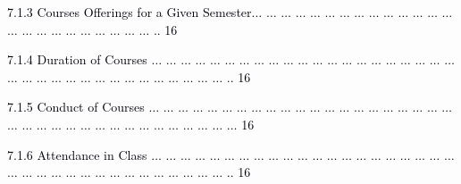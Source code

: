 \documentclass[12pt]{article}
\begin{document}
\vspace{\baselineskip}
\begin{adjustwidth}{0.5in}{0.0in}
{\fontsize{7pt}{8.4pt}\selectfont \textcolor[HTML]{00000A}{7.1.3 Courses Offerings for a Given Semester$ \ldots $ $ \ldots $ $ \ldots $ $ \ldots $ $ \ldots $ $ \ldots $ $ \ldots $ $ \ldots $ $ \ldots $ $ \ldots $ $ \ldots $ $ \ldots $ $ \ldots $ $ \ldots $ $ \ldots $ $ \ldots $ $ \ldots $ $ \ldots $ $ \ldots $ $ \ldots $ $ \ldots $ $ \ldots $ $ \ldots $ $ \ldots $ .. 16}\par}\par

\end{adjustwidth}


\vspace{\baselineskip}
\begin{adjustwidth}{0.5in}{0.0in}
{\fontsize{7pt}{8.4pt}\selectfont \textcolor[HTML]{00000A}{7.1.4 Duration of Courses $ \ldots $ $ \ldots $ $ \ldots $ $ \ldots $ $ \ldots $ $ \ldots $ $ \ldots $ $ \ldots $ $ \ldots $ $ \ldots $ $ \ldots $ $ \ldots $ $ \ldots $ $ \ldots $ $ \ldots $ $ \ldots $ $ \ldots $ $ \ldots $ $ \ldots $ $ \ldots $ $ \ldots $ $ \ldots $ $ \ldots $ $ \ldots $ $ \ldots $ $ \ldots $ $ \ldots $ $ \ldots $ $ \ldots $ $ \ldots $ $ \ldots $ $ \ldots $ $ \ldots $ $ \ldots $ $ \ldots $ $ \ldots $ .. 16}\par}\par

\end{adjustwidth}


\vspace{\baselineskip}
\begin{adjustwidth}{0.5in}{0.0in}
{\fontsize{7pt}{8.4pt}\selectfont \textcolor[HTML]{00000A}{7.1.5 Conduct of Courses $ \ldots $ $ \ldots $ $ \ldots $ $ \ldots $ $ \ldots $ $ \ldots $ $ \ldots $ $ \ldots $ $ \ldots $ $ \ldots $ $ \ldots $ $ \ldots $ $ \ldots $ $ \ldots $ $ \ldots $ $ \ldots $ $ \ldots $ $ \ldots $ $ \ldots $ $ \ldots $ $ \ldots $ $ \ldots $ $ \ldots $ $ \ldots $ $ \ldots $ $ \ldots $ $ \ldots $ $ \ldots $ $ \ldots $ $ \ldots $ $ \ldots $ $ \ldots $ $ \ldots $ $ \ldots $ $ \ldots $ $ \ldots $ $ \ldots $  16}\par}\par

\end{adjustwidth}


\vspace{\baselineskip}
\begin{adjustwidth}{0.5in}{0.0in}
{\fontsize{7pt}{8.4pt}\selectfont \textcolor[HTML]{00000A}{7.1.6 Attendance in Class $ \ldots $ $ \ldots $ $ \ldots $ $ \ldots $ $ \ldots $ $ \ldots $ $ \ldots $ $ \ldots $ $ \ldots $ $ \ldots $ $ \ldots $ $ \ldots $ $ \ldots $ $ \ldots $ $ \ldots $ $ \ldots $ $ \ldots $ $ \ldots $ $ \ldots $ $ \ldots $ $ \ldots $ $ \ldots $ $ \ldots $ $ \ldots $ $ \ldots $ $ \ldots $ $ \ldots $ $ \ldots $ $ \ldots $ $ \ldots $ $ \ldots $ $ \ldots $ $ \ldots $ $ \ldots $ $ \ldots $ $ \ldots $ .. 16}\par}\par

\end{adjustwidth}
\end{document}
